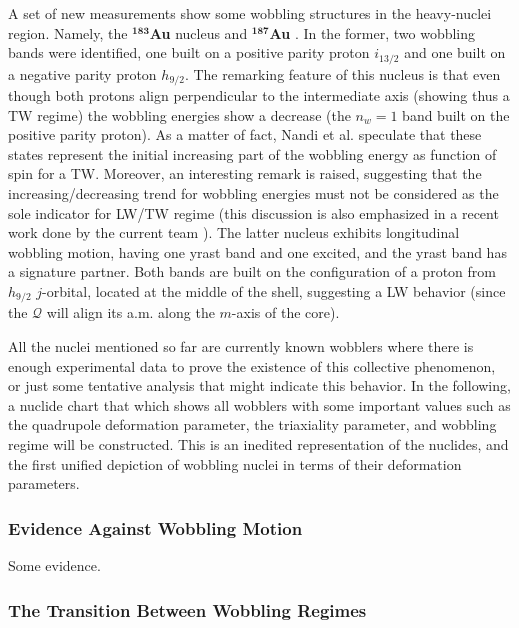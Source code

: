 A set of new measurements show some wobbling structures in the heavy-nuclei region. Namely, the $^\mathbf{183}$\textbf{Au} \cite{nandi2020first} nucleus and $^\mathbf{187}$\textbf{Au} \cite{sensharma2020longitudinal,sensharma2021wobbling}. In the former, two wobbling bands were identified, one built on a positive parity proton $i_{13/2}$ and one built on a negative parity proton $h_{9/2}$. The remarking feature of this nucleus is that even though both protons align perpendicular to the intermediate axis (showing thus a TW regime) the wobbling energies show a decrease (the $n_w=1$ band built on the positive parity proton). As a matter of fact, Nandi et al. speculate that these states represent the initial increasing part of the wobbling energy as function of spin for a TW. Moreover, an interesting remark is raised, suggesting that the increasing/decreasing trend for wobbling energies must not be considered as the sole indicator for LW/TW regime (this discussion is also emphasized in a recent work done by the current team \cite{poenaru2021extensive1,poenaru2021extensive2}). The latter nucleus exhibits longitudinal wobbling motion, having one yrast band and one excited, and the yrast band has a signature partner. Both bands are built on the configuration of a proton from $h_{9/2}$ $j$-orbital, located at the middle of the shell, suggesting a LW behavior (since the $\mathcal{Q}$ will align its a.m. along the $m$-axis of the core).

All the nuclei mentioned so far are currently known wobblers where there is enough experimental data to prove the existence of this collective phenomenon, or just some tentative analysis that might indicate this behavior. In the following, a nuclide chart that which shows all wobblers with some important values such as the quadrupole deformation parameter, the triaxiality parameter, and wobbling regime will be constructed. This is an inedited representation of the nuclides, and the first unified depiction of wobbling nuclei in terms of their deformation parameters.

\subsubsection*{Evidence Against Wobbling Motion}

Some evidence.

\subsubsection*{The Transition Between Wobbling Regimes}

